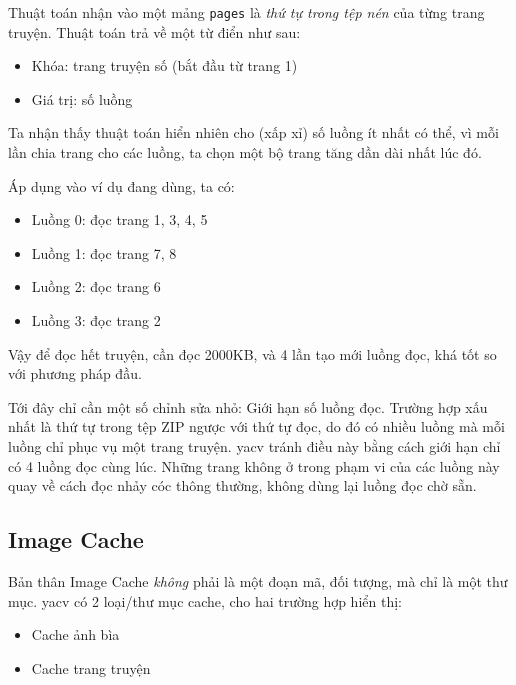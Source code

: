 \documentclass[../../../../thesis]{subfiles}
\begin{document}
Thuật toán nhận vào một mảng \texttt{pages} là \emph{thứ tự trong tệp nén} của
từng trang truyện. Thuật toán trả về một từ điển như sau:

\begin{itemize}
    \item
        Khóa: trang truyện số (bắt đầu từ trang 1)
    \item
        Giá trị: số luồng
\end{itemize}

Ta nhận thấy thuật toán hiển nhiên cho (xấp xỉ) số luồng ít nhất có thể, vì mỗi
lần chia trang cho các luồng, ta chọn một bộ trang tăng dần dài nhất lúc đó.

Áp dụng vào ví dụ đang dùng, ta có:

\begin{itemize}
    \item
        Luồng 0: đọc trang 1, 3, 4, 5
    \item
        Luồng 1: đọc trang 7, 8
    \item
        Luồng 2: đọc trang 6
    \item
        Luồng 3: đọc trang 2
\end{itemize}

Vậy để đọc hết truyện, cần đọc 2000KB, và 4 lần tạo mới luồng đọc, khá tốt so
với phương pháp đầu.

Tới đây chỉ cần một số chỉnh sửa nhỏ: Giới hạn số luồng đọc. Trường hợp xấu nhất
là thứ tự trong tệp ZIP ngược với thứ tự đọc, do đó có nhiều luồng mà mỗi luồng
chỉ phục vụ một trang truyện. yacv tránh điều này bằng cách giới hạn chỉ có 4
luồng đọc cùng lúc. Những trang không ở trong phạm vi của các luồng này quay về
cách đọc nhảy cóc thông thường, không dùng lại luồng đọc chờ sẵn.



\subsection{Image Cache}\label{sec:image-cache}

Bản thân Image Cache \emph{không} phải là một đoạn mã, đối tượng, mà chỉ là một
thư mục. yacv có 2 loại/thư mục cache, cho hai trường hợp hiển thị:

\begin{itemize}
    \item
        Cache ảnh bìa
    \item
        Cache trang truyện
\end{itemize}
\end{document}
